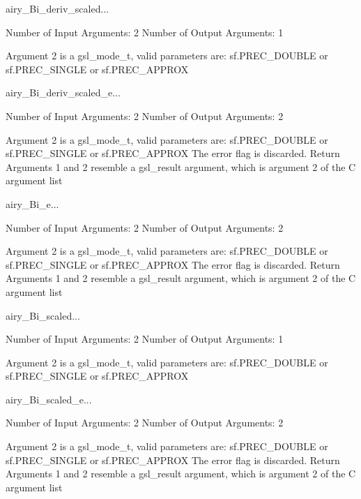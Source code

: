 \begin{funcdesc}{airy_Bi_deriv_scaled}{...}

    Number of Input  Arguments:  2
    Number of Output Arguments:  1

 Argument 2 is a gsl_mode_t, valid parameters are:
	sf.PREC_DOUBLE or sf.PREC_SINGLE or sf.PREC_APPROX

\end{funcdesc}

\begin{funcdesc}{airy_Bi_deriv_scaled_e}{...}

    Number of Input  Arguments:  2
    Number of Output Arguments:  2

 Argument 2 is a gsl_mode_t, valid parameters are:
	sf.PREC_DOUBLE or sf.PREC_SINGLE or sf.PREC_APPROX
The error flag is discarded.
Return Arguments 1 and 2 resemble a gsl_result argument,
	which is  argument 2 of the C argument list

\end{funcdesc}

\begin{funcdesc}{airy_Bi_e}{...}

    Number of Input  Arguments:  2
    Number of Output Arguments:  2

 Argument 2 is a gsl_mode_t, valid parameters are:
	sf.PREC_DOUBLE or sf.PREC_SINGLE or sf.PREC_APPROX
The error flag is discarded.
Return Arguments 1 and 2 resemble a gsl_result argument,
	which is  argument 2 of the C argument list

\end{funcdesc}

\begin{funcdesc}{airy_Bi_scaled}{...}

    Number of Input  Arguments:  2
    Number of Output Arguments:  1

 Argument 2 is a gsl_mode_t, valid parameters are:
	sf.PREC_DOUBLE or sf.PREC_SINGLE or sf.PREC_APPROX

\end{funcdesc}

\begin{funcdesc}{airy_Bi_scaled_e}{...}

    Number of Input  Arguments:  2
    Number of Output Arguments:  2

 Argument 2 is a gsl_mode_t, valid parameters are:
	sf.PREC_DOUBLE or sf.PREC_SINGLE or sf.PREC_APPROX
The error flag is discarded.
Return Arguments 1 and 2 resemble a gsl_result argument,
	which is  argument 2 of the C argument list

\end{funcdesc}

